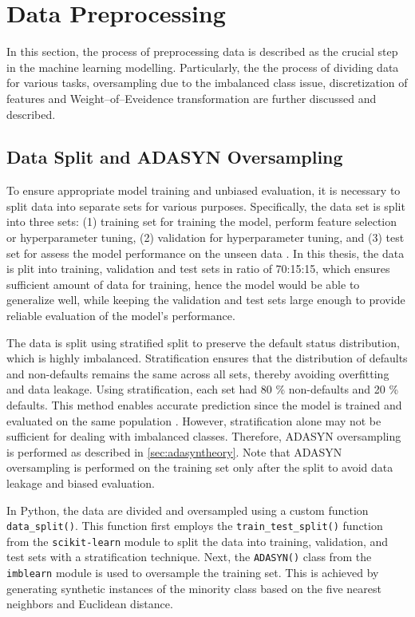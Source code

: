 \newpage
\section{Data Preprocessing}
In this section, the process of preprocessing data is described as the crucial step in the machine learning modelling. Particularly, the the process of dividing data for various tasks, oversampling due to the imbalanced class issue, discretization of features and Weight--of--Eveidence transformation are further discussed and described.

\subsection{Data Split and ADASYN Oversampling}
\label{subsec:data-split-ADASYN}

To ensure appropriate model training and unbiased evaluation, it is necessary to split data into separate sets for various purposes. Specifically, the data set is split into three sets: (1) training set for training the model, perform feature selection or hyperparameter tuning, (2) validation for hyperparameter tuning, and (3) test set for assess the model performance on the unseen data \citep{subasi2020practical}.
In this thesis, the data is plit into training, validation and test sets in ratio of 70:15:15, which ensures sufficient amount of data for training, hence the model would be able to generalize well, while keeping the validation and test sets large enough to provide reliable evaluation of the model's performance.

The data is split using stratified split to preserve the default status distribution, which is highly imbalanced.
Stratification ensures that the distribution of defaults and non-defaults remains the same across all sets, thereby avoiding overfitting and data leakage. Using stratification, each set had 80 \% non-defaults and 20 \% defaults. This method enables accurate prediction since the model is trained and evaluated on the same population \citep{igareta2021strat}.
However, stratification alone may not be sufficient for dealing with imbalanced classes. Therefore, ADASYN oversampling is performed as described in \autoref{sec:adasyntheory}. Note that ADASYN oversampling is performed on the training set only after the split to avoid data leakage and biased evaluation.

In Python, the data are divided and oversampled using a custom function \lstinline{data_split()}.
This function first employs the \lstinline{train_test_split()} function from the \lstinline{scikit-learn} module to split the data into training, validation, and test sets with a stratification technique.
Next, the \lstinline{ADASYN()} class from the \lstinline{imblearn} module is used to oversample the training set. This is achieved by generating synthetic instances of the minority class based on the five nearest neighbors and Euclidean distance.

